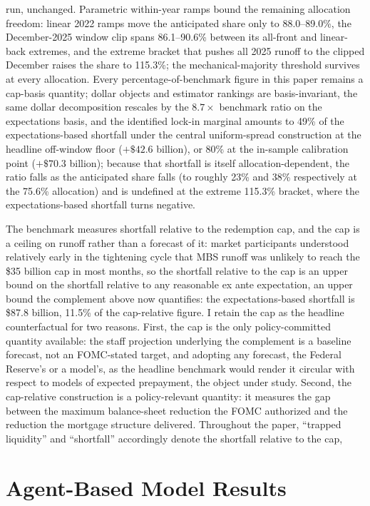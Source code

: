 \documentclass[12pt]{article}
\begin{document}
run, unchanged. Parametric within-year ramps bound the remaining allocation freedom: linear 2022 ramps move the anticipated share only to 88.0--89.0\%, the December-2025 window clip spans 86.1--90.6\% between its all-front and linear-back extremes, and the extreme bracket that pushes all 2025 runoff to the clipped December raises the share to 115.3\%; the mechanical-majority threshold survives at every allocation. Every percentage-of-benchmark figure in this paper remains a cap-basis quantity; dollar objects and estimator rankings are basis-invariant, the same dollar decomposition rescales by the $8.7\times$ benchmark ratio on the expectations basis, and the identified lock-in marginal amounts to 49\% of the expectations-based shortfall under the central uniform-spread construction at the headline off-window floor ($+\$42.6$ billion), or 80\% at the in-sample calibration point ($+\$70.3$ billion); because that shortfall is itself allocation-dependent, the ratio falls as the anticipated share falls (to roughly 23\% and 38\% respectively at the 75.6\% allocation) and is undefined at the extreme 115.3\% bracket, where the expectations-based shortfall turns negative.

The benchmark measures shortfall relative to the redemption cap, and the cap is a ceiling on runoff rather than a forecast of it: market participants understood relatively early in the tightening cycle that MBS runoff was unlikely to reach the \$35 billion cap in most months, so the shortfall relative to the cap is an upper bound on the shortfall relative to any reasonable ex ante expectation, an upper bound the complement above now quantifies: the expectations-based shortfall is \$87.8 billion, 11.5\% of the cap-relative figure. I retain the cap as the headline counterfactual for two reasons. First, the cap is the only policy-committed quantity available: the staff projection underlying the complement is a baseline forecast, not an FOMC-stated target, and adopting any forecast, the Federal Reserve's or a model's, as the headline benchmark would render it circular with respect to models of expected prepayment, the object under study. Second, the cap-relative construction is a policy-relevant quantity: it measures the gap between the maximum balance-sheet reduction the FOMC authorized and the reduction the mortgage structure delivered. Throughout the paper, ``trapped liquidity'' and ``shortfall'' accordingly denote the shortfall relative to the cap,

\section{Agent-Based Model Results}\label{sec:abm}
\end{document}
